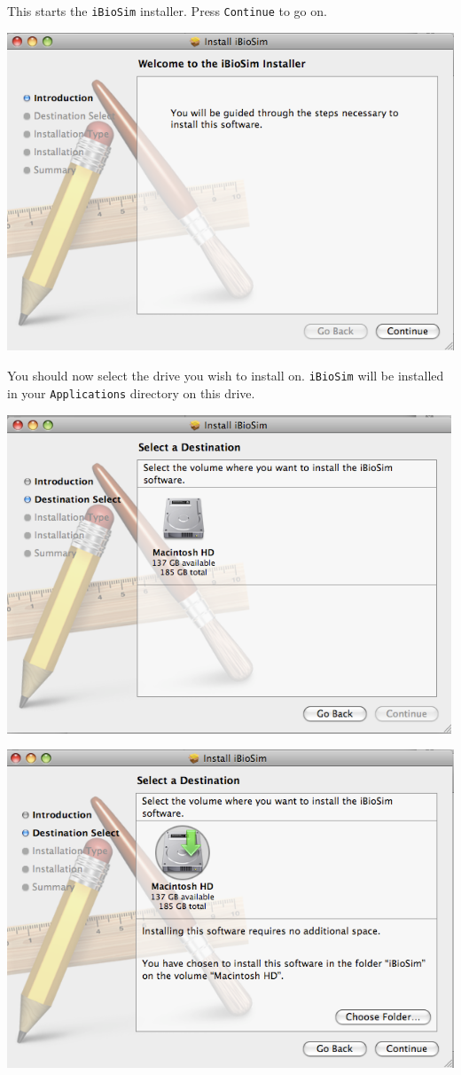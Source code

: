 \documentclass[titlepage,11pt]{article}
\begin{document}
This starts the {\tt iBioSim} installer.  Press {\tt Continue} to go on.

\includegraphics[height=95mm]{screenshots/intro}

\clearpage

You should now select the drive you wish to install on.  {\tt iBioSim}
will be installed in your {\tt Applications} directory on this drive.

\includegraphics[height=95mm]{screenshots/destination}

\includegraphics[height=95mm]{screenshots/select}
\end{document}
